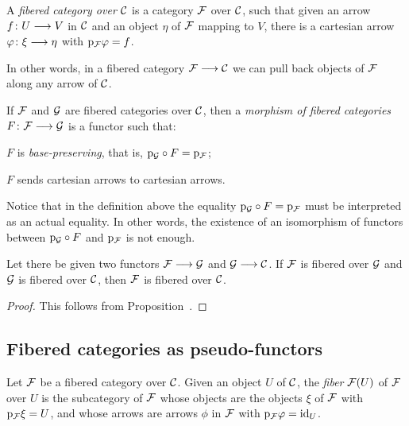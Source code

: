 \begin{3   FIBERED CATEGORIES}
\begin{3.1 Fibered categories}
\begin{definition} A \emph{fibered category over $\mathcal{C}$} is a category $\mathcal{F}$ over $\mathcal{C}$, such that given an arrow $f \colon U \arr V$ in $\mathcal{C}$ and an object $\eta$ of $\mathcal{F}$ mapping to $V$, there is a cartesian arrow $\phi\colon \xi \arr \eta$ with $\mathrm{p}_{\mathcal{F}} \varphi = f$.
\end{definition}

In other words, in a fibered category $\cF \arr \cC$  we can pull back objects of $\mathcal{F}$ along any arrow of $\mathcal{C}$.

\begin{definition}
If $\mathcal{F}$ and $\mathcal{G}$ are fibered categories over $\mathcal{C}$, then a \emph{morphism of fibered categories} $F \colon \cF \arr \cG$ is a functor such that:

\begin{enumeratei}
\item $F$ is \emph{base-preserving}, that is, $\mathrm{p}_{\mathcal{G}} \circ F = \mathrm{p}_{\mathcal{F}}$; \item $F$ sends cartesian arrows to cartesian arrows.
\end{enumeratei}
\end{definition}

Notice that in the definition above the equality $\mathrm{p}_{\mathcal{G}} \circ F = \mathrm{p}_{\mathcal{F}}$ must be interpreted as an actual equality. In other words, the existence of an isomorphism of functors between $\mathrm{p}_{\mathcal{G}} \circ F$ and $\mathrm{p}_{\mathcal{F}}$ is not enough.
 
\begin{proposition}
Let there be given two functors $\cF \arr \cG$ and $\cG \arr \cC$. If $\mathcal{F}$ is fibered over $\mathcal{G}$ and $\mathcal{G}$ is fibered over $\mathcal{C}$, then $\mathcal{F}$ is fibered over $\mathcal{C}$.
\end{proposition}

\begin{proof}
This follows from Proposition~.
\end{proof}


\subsection{Fibered categories as pseudo-functors}

\begin{definition} Let $\mathcal{F}$ be a fibered category over $\mathcal{C}$. Given an object $U$ of $\mathcal{C}$, the \emph{fiber} $\mathcal{F}(U)$ of $\mathcal{F}$ over $U$ is the subcategory of $\mathcal{F}$ whose objects are the objects $\xi$ of $\mathcal{F}$ with $\mathrm{p}_{\mathcal{F}} \xi = U$, and whose arrows are arrows $\phi$ in $\mathcal{F}$ with $\mathrm{p}_{\mathcal{F}} \varphi = \mathrm{id}_U$.
\end{definition}


\end{3.1 Fibered categories}
\end{3   FIBERED CATEGORIES}
